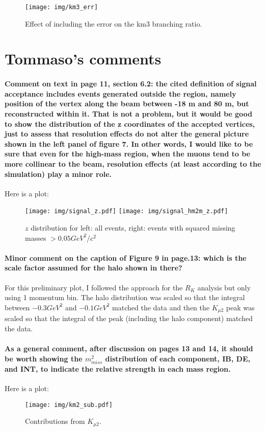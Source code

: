 \documentclass[12pt]{report}
\begin{document}
\begin{figure}[b!]
    \texttt{[image: img/km3\_err]}
    \caption{Effect of including the error on the km3 branching ratio.}
\end{figure}
\clearpage

\paragraphfont{\color{DarkOliveGreen4}}  %
\section{Tommaso's comments}

\paragraph{Comment on text in page 11, section 6.2: the cited definition of signal acceptance includes events generated outside the region, namely position of the vertex along the beam between -18 m and 80 m, but reconstructed within it. That is not a problem, but it would be good to show the distribution of the z coordinates of the accepted vertices, just to assess that resolution effects do not alter the general picture shown in the left panel of figure 7. In other words, I would like to be sure that even for the high-mass region, when the muons tend to be more collinear to the beam, resolution effects (at least according to the simulation) play a minor role.}

Here is a plot:

\begin{figure}[h!]
    \texttt{[image: img/signal\_z.pdf]}
    \texttt{[image: img/signal\_hm2m\_z.pdf]}
    \caption{$z$ distribution for left: all events, right: events with squared missing masses $> 0.05 GeV^2/c^2$}
\end{figure}

\paragraph{Minor comment on the caption of Figure 9 in page.13: which is the scale factor assumed for the halo shown in there?}
For this preliminary plot, I followed the approach for the $R_K$ analysis but only using 1 momentum bin.
The halo distribution was scaled so that the integral between $-0.3 GeV^2$ and $-0.1 GeV^2$ matched the data and then the $K_{\mu2}$ peak was scaled so that the integral of the peak (including the halo component) matched the data.

\paragraph{As a general comment, after discussion on pages 13 and 14, it should be worth showing the $m^2_{miss}$
distribution of each component, IB, DE, and INT, to indicate the relative strength in each mass region.\\}
Here is a plot:
\begin{figure}[h!]
    \texttt{[image: img/km2\_sub.pdf]}
    \caption{Contributions from $K_{\mu 2}$.}
\end{figure}
\end{document}
